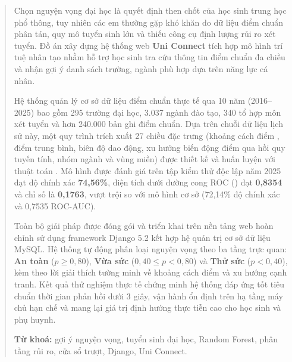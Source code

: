 \begin{abstract}

Chọn nguyện vọng đại học là quyết định then chốt của học sinh trung học phổ thông, tuy nhiên các em thường gặp khó khăn do dữ liệu điểm chuẩn phân tán, quy mô tuyển sinh lớn và thiếu công cụ định lượng rủi ro xét tuyển. Đồ án xây dựng hệ thống web \textbf{Uni Connect} tích hợp mô hình trí tuệ nhân tạo nhằm hỗ trợ học sinh tra cứu thông tin điểm chuẩn đa chiều và nhận gợi ý danh sách trường, ngành phù hợp dựa trên năng lực cá nhân.

Hệ thống quản lý cơ sở dữ liệu điểm chuẩn thực tế qua 10 năm (2016--2025) bao gồm 295 trường đại học, 3.037 ngành đào tạo, 340 tổ hợp môn xét tuyển và hơn 240.000 bản ghi điểm chuẩn. Dựa trên chuỗi dữ liệu lịch sử này, một quy trình trích xuất 27 chiều đặc trưng (khoảng cách điểm , điểm trung bình, biên độ dao động, xu hướng biến động điểm qua hồi quy tuyến tính, nhóm ngành và vùng miền) được thiết kế và huấn luyện với thuật toán . Mô hình được đánh giá trên tập kiểm thử độc lập năm 2025 đạt độ chính xác \textbf{74,56\%}, diện tích dưới đường cong ROC () đạt \textbf{0,8354} và chỉ số  là \textbf{0,1763}, vượt trội so với mô hình cơ sở  (72,14\% độ chính xác và 0,7535 ROC-AUC).

Toàn bộ giải pháp được đóng gói và triển khai trên nền tảng web hoàn chỉnh sử dụng framework Django 5.2 kết hợp hệ quản trị cơ sở dữ liệu MySQL. Hệ thống tự động phân loại nguyện vọng theo ba tầng trực quan: \textbf{An toàn} ($p \ge 0{,}80$), \textbf{Vừa sức} ($0{,}40 \le p < 0{,}80$) và \textbf{Thử sức} ($p < 0{,}40$), kèm theo lời giải thích tường minh về khoảng cách điểm và xu hướng cạnh tranh. Kết quả thử nghiệm thực tế chứng minh hệ thống đáp ứng tốt tiêu chuẩn thời gian phản hồi dưới 3 giây, vận hành ổn định trên hạ tầng máy chủ hạn chế và mang lại giá trị định hướng thực tiễn cao cho học sinh và phụ huynh.

\vspace{0.8em}
\noindent\textbf{Từ khoá:} gợi ý nguyện vọng, tuyển sinh đại học, Random Forest, phân tầng rủi ro, cửa sổ trượt, Django, Uni Connect.

\end{abstract}
